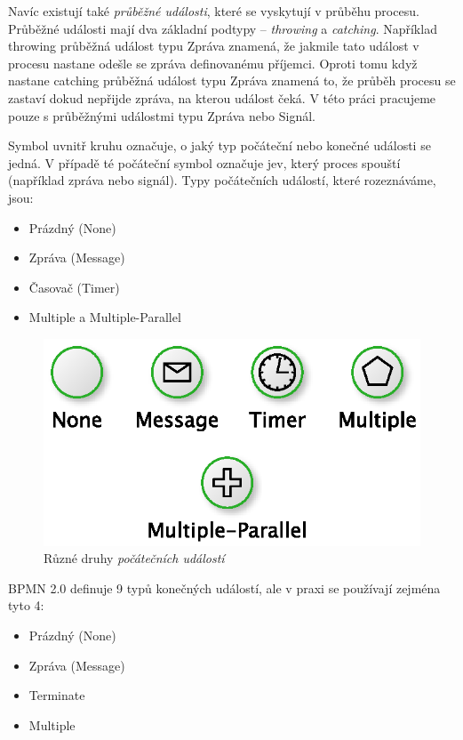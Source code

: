Navíc existují také \textit{průběžné události}, které se vyskytují v průběhu procesu. Průběžné události mají dva základní podtypy – \textit{throwing} a \textit{catching}. Například throwing průběžná událost typu Zpráva znamená, že jakmile tato událost v procesu nastane odešle se zpráva definovanému příjemci. Oproti tomu když nastane catching průběžná událost typu Zpráva znamená to, že průběh procesu se zastaví dokud nepřijde zpráva, na kterou událost čeká. V této práci pracujeme pouze s průběžnými událostmi typu Zpráva nebo Signál.

Symbol uvnitř kruhu označuje, o jaký typ počáteční nebo konečné události se jedná. V případě té počáteční symbol označuje jev, který proces spouští (například zpráva nebo signál). Typy počátečních událostí, které rozeznáváme, jsou:

\begin{itemize}
\item Prázdný (None)
\item Zpráva (Message)
\item Časovač (Timer)
\item Multiple a Multiple-Parallel
\end{itemize}

\begin{figure}[H]\centering
\includegraphics{obrazky/start-events}
\caption{Různé druhy \textit{počátečních událostí}}
\label{fig:pocatecni_udalosti}
\end{figure}

BPMN 2.0 definuje 9 typů konečných událostí, ale v praxi se používají zejména tyto 4: \cite{Silver2011}

\begin{itemize}
\item Prázdný (None)
\item Zpráva (Message)
\item Terminate
\item Multiple
\end{itemize}

